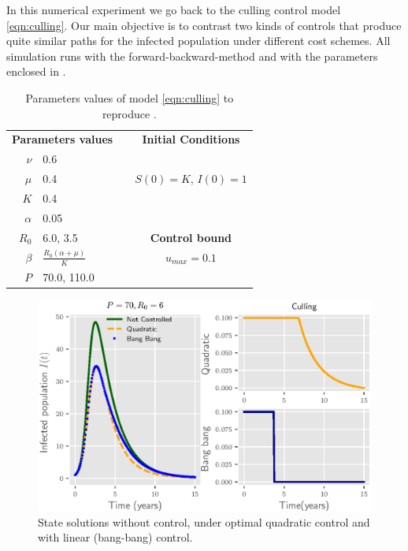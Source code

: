 In this numerical experiment we go back to the culling control model
\eqref{eqn:culling}. Our main objective is to contrast two kinds of controls that produce quite similar paths for the infected population under different cost schemes. All simulation runs with the 
forward-backward-method and with the parameters enclosed in 
.


\begin{table}[H]
  \begin{center}
    \begin{tabular}{@{}rllc@{}}
      \toprule
      \multicolumn{2}{c}{\textbf{Parameters values}}
      &&
      \textbf{Initial Conditions}
      \\
      \cmidrule{1-2}
      \cmidrule{4-4}
      $\nu$
        & \num{0.6}
      \\
      $\mu$
        & \num{0.4}
        &&  
          $S(0) = K$, 
          $I(0) = 1$
      \\
      $K$
        & \num{0.4}
      \\
      $\alpha$
        & \num{0.05}
      \\
      $R_0$
        & \num{6.0}, \num{3.5}
        && 
          \textbf{Control bound}
      \\
      \cmidrule{4-4}
      $\beta$
        &
         $
          \displaystyle
          \frac{R_0(\alpha + \mu)}{K}
         $
        &&
          $u_{max} = \num{0.1}$
      \\
      $P$
        & \num{70.0}, \num{110.0}
      \\
      \bottomrule
    \end{tabular}
  \end{center}
  \caption{Parameters values of model \eqref{eqn:culling} to reproduce 
  .}
  \label{tbl:culling_par}
\end{table}

\begin{figure}[H]
  \centering
  \includegraphics{Figures/figure_1_culling}
  \caption{State solutions without control, under optimal quadratic control 
  and with linear (bang-bang) control.}
  \label{fig:figure1culling}
\end{figure}

